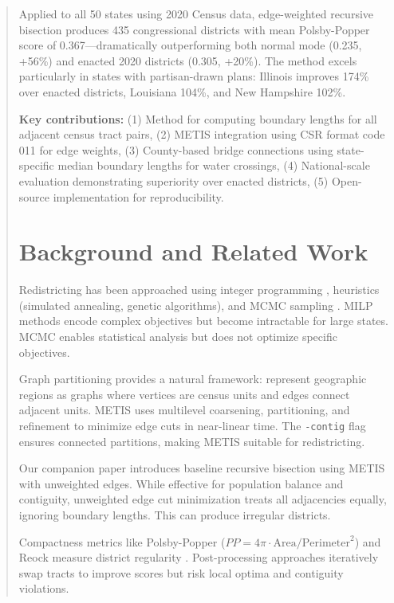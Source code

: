 \documentclass[11pt,twocolumn]{article}
\begin{document}
\begin{abstract}
Applied to all 50 states using 2020 Census data, edge-weighted recursive bisection produces 435 congressional districts with mean Polsby-Popper score of 0.367—dramatically outperforming both normal mode (0.235, +56\%) and enacted 2020 districts (0.305, +20\%). The method excels particularly in states with partisan-drawn plans: Illinois improves 174\% over enacted districts, Louisiana 104\%, and New Hampshire 102\%.

\textbf{Key contributions:} (1) Method for computing boundary lengths for all adjacent census tract pairs, (2) METIS integration using CSR format code 011 for edge weights, (3) County-based bridge connections using state-specific median boundary lengths for water crossings, (4) National-scale evaluation demonstrating superiority over enacted districts, (5) Open-source implementation for reproducibility.

\section{Background and Related Work}

Redistricting has been approached using integer programming \cite{garfinkel1970optimal}, heuristics (simulated annealing, genetic algorithms), and MCMC sampling \cite{duchin2018outlier}. MILP methods encode complex objectives but become intractable for large states. MCMC enables statistical analysis but does not optimize specific objectives.

Graph partitioning provides a natural framework: represent geographic regions as graphs where vertices are census units and edges connect adjacent units. METIS \cite{karypis1998metis} uses multilevel coarsening, partitioning, and refinement to minimize edge cuts in near-linear time. The \texttt{-contig} flag ensures connected partitions, making METIS suitable for redistricting.

Our companion paper \cite{TODO-paper1} introduces baseline recursive bisection using METIS with unweighted edges. While effective for population balance and contiguity, unweighted edge cut minimization treats all adjacencies equally, ignoring boundary lengths. This can produce irregular districts.

Compactness metrics like Polsby-Popper ($PP = 4\pi \cdot \text{Area}/\text{Perimeter}^2$) and Reock measure district regularity \cite{polsby1991third,reock1961measuring}. Post-processing approaches iteratively swap tracts to improve scores but risk local optima and contiguity violations.


\end{abstract}
\end{document}
